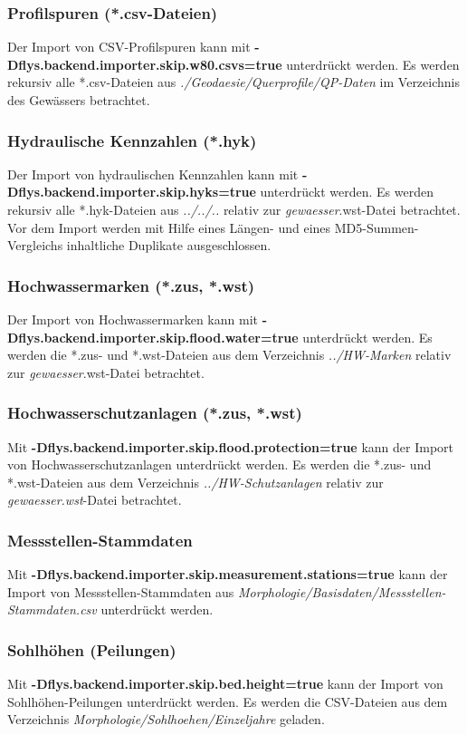 \subsubsection{Profilspuren (*.csv-Dateien)}
Der Import von CSV-Profilspuren kann mit
\textbf{-Dflys.backend.importer.skip.w80.csvs=true}
unterdrückt werden.
Es werden rekursiv alle *.csv-Dateien aus
\textit{./Geodaesie/Querprofile/QP-Daten} im Verzeichnis des
Gewässers betrachtet.

\subsubsection{Hydraulische Kennzahlen (*.hyk)}
Der Import von hydraulischen Kennzahlen kann mit \textbf{-Dflys.backend.importer.skip.hyks=true} unterdrückt
werden. Es werden rekursiv alle *.hyk-Dateien aus \textit{../../..} relativ zur
\textit{gewaesser}.wst-Datei betrachtet. Vor dem Import werden mit Hilfe eines Längen- und
eines MD5-Summen-Vergleichs inhaltliche Duplikate ausgeschlossen.

\subsubsection{Hochwassermarken (*.zus, *.wst)}
Der Import von Hochwassermarken kann mit \textbf{-Dflys.backend.importer.skip.flood.water=true}
unterdrückt werden. Es werden die *.zus- und *.wst-Dateien aus dem Verzeichnis
\textit{../HW-Marken} relativ zur \textit{gewaesser}.wst-Datei betrachtet.

\subsubsection{Hochwasserschutzanlagen (*.zus, *.wst)}
Mit \textbf{-Dflys.backend.importer.skip.flood.protection=true}
kann der Import von Hochwasserschutzanlagen
unterdrückt werden. Es werden die *.zus- und *.wst-Dateien aus dem Verzeichnis
\textit{../HW-Schutzanlagen} relativ zur \textit{gewaesser.wst}-Datei betrachtet.

\subsubsection{Messstellen-Stammdaten}
Mit \textbf{-Dflys.backend.importer.skip.measurement.stations=true}
kann der Import von Messstellen-Stammdaten aus
\textit{Morphologie/Basisdaten/Messstellen-Stammdaten.csv}
unterdrückt werden.

\subsubsection{Sohlhöhen (Peilungen)}
Mit \textbf{-Dflys.backend.importer.skip.bed.height=true}
kann der Import von Sohlhöhen-Peilungen unterdrückt werden.
Es werden die CSV-Dateien aus dem Verzeichnis
\textit{Morphologie/Sohlhoehen/Einzeljahre} geladen.

